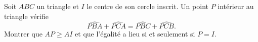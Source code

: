 Soit $ABC$ un triangle et $I$ le centre de son cercle inscrit. Un point $P$ intérieur au triangle vérifie
\[
\widehat{PBA} + \widehat{PCA} = \widehat{PBC} + \widehat{PCB}.
\]
Montrer que $AP \geq AI$ et que l'égalité a lieu si et seulement si $P = I$.
